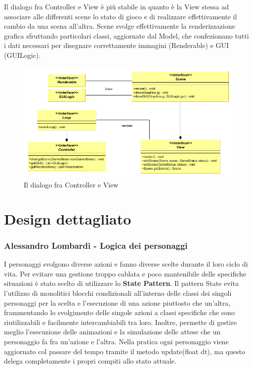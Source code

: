 \documentclass[a4paper,12pt, hidelinks]{report}
\begin{document}
Il dialogo fra Controller e View è più stabile in quanto è la View stessa ad associare alle differenti scene lo stato di gioco e di realizzare effettivamente il cambio da una scena all'altra. Scene svolge effettivamente la renderizzazione grafica sfruttando particolari classi, aggiornate dal Model, che confezionano tutti i dati necessari per disegnare correttamente immagini (Renderable) e GUI (GUILogic).

\begin{figure}[H]
\centering{}
\includegraphics[width=\linewidth]{img/ArchitetturaControllerView}
\caption{Il dialogo fra Controller e View}
\label{img:ControllerView}
\end{figure}

\section{Design dettagliato}

\begin{flushright}
\item\subsubsection{Alessandro Lombardi - Logica dei personaggi}
\end{flushright}

I personaggi svolgono diverse azioni e fanno diverse scelte durante il loro ciclo di vita. Per evitare una gestione troppo cablata e poco mantenibile delle specifiche situazioni è stato scelto di utilizzare lo \textbf{State Pattern}. Il pattern State evita l'utilizzo di monolitici  blocchi condizionali all'interno delle classi dei singoli personaggi per la scelta e l’esecuzione di una azione piuttosto che un’altra, frammentando lo svolgimento delle singole azioni a classi specifiche che sono riutilizzabili e facilmente intercambiabili tra loro. Inoltre, permette di gestire meglio l'esecuzione delle animazioni e la simulazione delle attese che un personaggio fa fra un'azione e l'altra. Nella pratica ogni personaggio viene aggiornato col passare del tempo tramite il metodo update(float dt), ma questo delega completamente i propri compiti allo stato attuale.
\end{document}
